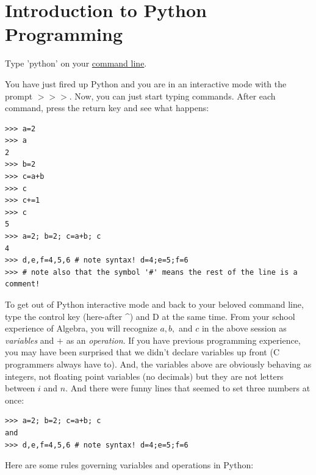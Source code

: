 \documentclass[11pt]{book}
\begin{document}
{

\chapter{Introduction to Python Programming}
\label{chap:python}

Type 'python' on your \href{#command_line}{command line}.

You have just fired up Python and  you are in an interactive mode with the prompt  {\color{blue}$>>>$}.  Now, you can just start typing commands. After each command, press the return key and see what happens:

{ \color{blue} \begin{verbatim}
>>> a=2
>>> a
2
>>> b=2
>>> c=a+b
>>> c
>>> c+=1
>>> c
5
>>> a=2; b=2; c=a+b; c
4
>>> d,e,f=4,5,6 # note syntax! d=4;e=5;f=6
>>> # note also that the symbol '#' means the rest of the line is a comment!
\end{verbatim}}

To get out of Python interactive mode and back to your beloved command line, type the control key (here-after  {\color{blue}\^{ }}) and  {\color{blue}D} at the same time.
From your  school experience of Algebra, you will recognize $a, b,$ and $c$ in the above session as {\it variables} and $+$ as an {\it operation}. If you have previous programming experience, you may have been surprised that we didn't declare variables up front (C programmers always have to).  And, the variables above are obviously behaving as integers, not floating point variables (no decimals) but they are not letters between $i$ and $n$.  And there were funny lines that seemed to set three numbers at once:

{ \color{blue} \begin{verbatim}
>>> a=2; b=2; c=a+b; c
and
>>> d,e,f=4,5,6 # note syntax! d=4;e=5;f=6
\end{verbatim}}
\noindent
Here are some rules governing variables and operations in Python:


}
\end{document}

